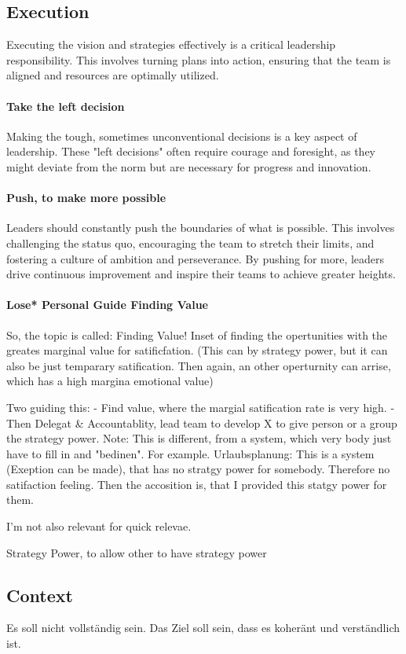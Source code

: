\subsection{Execution}
Executing the vision and strategies effectively is a critical leadership responsibility. This involves turning plans into action, ensuring that the team is aligned and resources are optimally utilized.

\paragraph{Take the left decision}
Making the tough, sometimes unconventional decisions is a key aspect of leadership. These "left decisions" often require courage and foresight, as they might deviate from the norm but are necessary for progress and innovation.

\paragraph{Push, to make more possible}
Leaders should constantly push the boundaries of what is possible. This involves challenging the status quo, encouraging the team to stretch their limits, and fostering a culture of ambition and perseverance. By pushing for more, leaders drive continuous improvement and inspire their teams to achieve greater heights.

\paragraph{Lose* Personal Guide Finding Value}


So, the topic is called: Finding Value!
Inset of finding the opertunities with the greates marginal value for satificfation. (This can by strategy power, but it can also be just temparary satification. Then again, an other operturnity can arrise, which has a high margina emotional value)

Two guiding this:
- Find value, where the margial satification rate is very high. 
- Then Delegat & Accountablity, lead team to develop X to give person or a group the strategy power.
Note: This is different, from a system, which very body just have to fill in and "bedinen". For example. Urlaubsplanung: This is a system (Exeption can be made), that has no stratgy power for somebody. Therefore no satifaction feeling. Then the accosition is, that I provided this statgy power for them.

I'm not also relevant for quick relevae.

Strategy Power, to allow other to have strategy power


\subsection{Context}
Es soll nicht vollständig sein.
Das Ziel soll sein, dass es koheränt und verständlich ist.